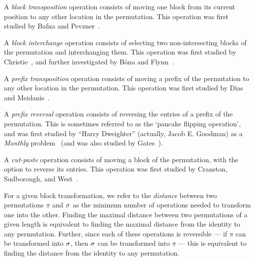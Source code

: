     \begin{definition}\label{polyclass:def:blocktrans}
      A \emph{block transposition} operation consists of moving one block
      from its current position to any other location in the permutation. 
      This operation was first studied by Bafna and Pevzner~\cite{Bafna1998}. 
    \end{definition}
  
    \begin{definition}\label{polyclass:def:blockint}
      A \emph{block interchange} operation consists of selecting two
      non-intersecting blocks of the permutation and interchanging them. 
      This operation was first studied by Christie~\cite{Christie1996}, and
      further investigated by B\'ona and Flynn~\cite{Bona2009}. 
    \end{definition}
  
    \begin{definition}\label{polyclass:def:prefixtrans}
      A \emph{prefix transposition} operation consists of moving a prefix of
      the permutation to any other location in the permutation. 
      This operation was first studied by Dias and Meidanis~\cite{Dias2002}.
    \end{definition}
      
    \begin{definition}\label{polyclass:def:prefixrev}
      A \emph{prefix reversal} operation consists of reversing the entries of a
      prefix of the permutation. This is sometimes referred to as the `pancake
      flipping operation', and was first studied by ``Harry Dweighter''
      (actually, Jacob E. Goodman) as a \emph{Monthly}
      problem~\cite{Dweighter} (and was also studied by Gates~\cite{BillGates}). 
    \end{definition}
  
    \begin{definition}\label{polyclass:def:cutpaste}
      A \emph{cut-paste} operation consists of moving a block of the
      permutation, with the option to reverse its entries. 
      This operation was first studied by Cranston, Sudborough, and
      West~\cite{Cranston2007}. 
    \end{definition}
  
    For a given block transformation, we refer to the \emph{distance} between
    two permutations $\pi$ and $\sigma$ as the minimum number of operations needed
    to transform one into the other. Finding the maximal distance between two
    permutations of a given length is equivalent to finding the maximal
    distance from the identity to any permutation. Further, since each of these
    operations is reversible --- if $\pi$ can be transformed into $\sigma$, then
    $\sigma$ can be transformed into $\pi$ --- this is equivalent to finding the
    distance from the identity to any permutation. 


